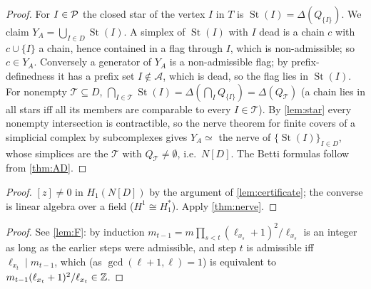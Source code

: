 \begin{proof}
For $I\in\mathcal{P}$ the closed star of the vertex $I$ in $T$ is $\operatorname{St}(I)=\Delta(Q_{\{I\}})$. We claim $Y_A=\bigcup_{I\in D}\operatorname{St}(I)$. A simplex of $\operatorname{St}(I)$ with $I$ dead is a chain $c$ with $c\cup\{I\}$ a chain, hence contained in a flag through $I$, which is non-admissible; so $c\in Y_A$. Conversely a generator of $Y_A$ is a non-admissible flag; by prefix-definedness it has a prefix set $I\notin\mathcal A$, which is dead, so the flag lies in $\operatorname{St}(I)$. For nonempty $\mathcal T\subseteq D$,
$\bigcap_{I\in\mathcal T}\operatorname{St}(I)=\Delta(\bigcap_IQ_{\{I\}})=\Delta(Q_{\mathcal T})$ (a chain lies in all stars iff all its members are comparable to every $I\in\mathcal T$). By \cref{lem:star} every nonempty intersection is contractible, so the nerve theorem for finite covers of a simplicial complex by subcomplexes gives $Y_A\simeq$ the nerve of $\{\operatorname{St}(I)\}_{I\in D}$, whose simplices are the $\mathcal T$ with $Q_{\mathcal T}\ne\emptyset$, i.e.\ $N[D]$. The Betti formulas follow from \cref{thm:AD}.
\end{proof}
\begin{proof}
$[z]\neq0$ in $H_1(N[D])$ by the argument of \cref{lem:certificate}; the converse is linear algebra over a field ($H^1\cong H_1^\ast$). Apply \cref{thm:nerve}.
\end{proof}
\begin{proof}
See \cref{lem:F}: by induction $m_{t-1}=m\prod_{s<t}(\ell_{x_s}+1)^2/\ell_{x_s}$ is an integer as long as the earlier steps were admissible, and step $t$ is admissible iff $\ell_{x_t}\mid m_{t-1}$, which (as $\gcd(\ell+1,\ell)=1$) is equivalent to $m_{t-1}(\ell_{x_t}+1)^2/\ell_{x_t}\in\mathbb{Z}$.
\end{proof}

